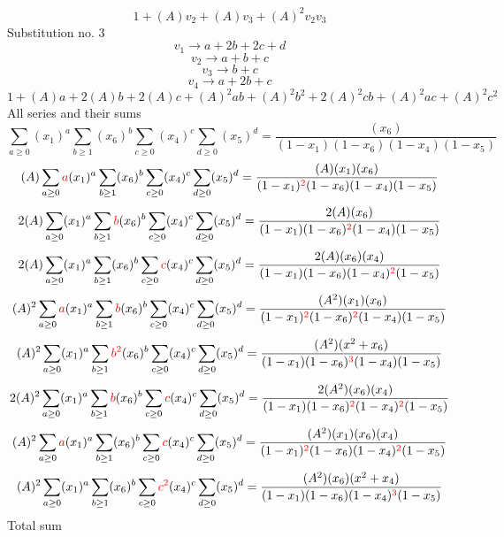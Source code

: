 \documentclass{article}
\begin{document}
\[1+(A)v_2+(A)v_3+(A)^2v_2v_3\]Substitution no. 3\[v_1\rightarrow{a+2b+2c+d}\]\[v_2\rightarrow{a+b+c}\]\[v_3\rightarrow{b+c}\]\[v_4\rightarrow{a+2b+c}\]\[1+(A)a+2(A)b+2(A)c+(A)^2ab+(A)^2b^{2}+2(A)^2cb+(A)^2ac+(A)^2c^{2}\]All series and their sums\[\sum_{a\geq{0}}(x_1)^{a}\sum_{b\geq{1}}(x_6)^{b}\sum_{c\geq{0}}(x_4)^{c}\sum_{d\geq{0}}(x_5)^{d}=\frac{(x_6)}{(1-x_1)(1-x_6)(1-x_4)(1-x_5)}\]\[(A)\sum_{a\geq{0}}\textcolor{red}{a}(x_1)^{a}\sum_{b\geq{1}}(x_6)^{b}\sum_{c\geq{0}}(x_4)^{c}\sum_{d\geq{0}}(x_5)^{d}=\frac{(A)(x_1)(x_6)}{(1-x_1)^{\textcolor{red}{2}}(1-x_6)(1-x_4)(1-x_5)}\]\[2(A)\sum_{a\geq{0}}(x_1)^{a}\sum_{b\geq{1}}\textcolor{red}{b}(x_6)^{b}\sum_{c\geq{0}}(x_4)^{c}\sum_{d\geq{0}}(x_5)^{d}=\frac{2(A)(x_6)}{(1-x_1)(1-x_6)^{\textcolor{red}{2}}(1-x_4)(1-x_5)}\]\[2(A)\sum_{a\geq{0}}(x_1)^{a}\sum_{b\geq{1}}(x_6)^{b}\sum_{c\geq{0}}\textcolor{red}{c}(x_4)^{c}\sum_{d\geq{0}}(x_5)^{d}=\frac{2(A)(x_6)(x_4)}{(1-x_1)(1-x_6)(1-x_4)^{\textcolor{red}{2}}(1-x_5)}\]\[(A)^{2}\sum_{a\geq{0}}\textcolor{red}{a}(x_1)^{a}\sum_{b\geq{1}}\textcolor{red}{b}(x_6)^{b}\sum_{c\geq{0}}(x_4)^{c}\sum_{d\geq{0}}(x_5)^{d}=\frac{(A^{2})(x_1)(x_6)}{(1-x_1)^{\textcolor{red}{2}}(1-x_6)^{\textcolor{red}{2}}(1-x_4)(1-x_5)}\]\[(A)^{2}\sum_{a\geq{0}}(x_1)^{a}\sum_{b\geq{1}}\textcolor{red}{b^{2}}(x_6)^{b}\sum_{c\geq{0}}(x_4)^{c}\sum_{d\geq{0}}(x_5)^{d}=\frac{(A^{2})(x^{2}+x_6)}{(1-x_1)(1-x_6)^{\textcolor{red}{3}}(1-x_4)(1-x_5)}\]\[2(A)^{2}\sum_{a\geq{0}}(x_1)^{a}\sum_{b\geq{1}}\textcolor{red}{b}(x_6)^{b}\sum_{c\geq{0}}\textcolor{red}{c}(x_4)^{c}\sum_{d\geq{0}}(x_5)^{d}=\frac{2(A^{2})(x_6)(x_4)}{(1-x_1)(1-x_6)^{\textcolor{red}{2}}(1-x_4)^{\textcolor{red}{2}}(1-x_5)}\]\[(A)^{2}\sum_{a\geq{0}}\textcolor{red}{a}(x_1)^{a}\sum_{b\geq{1}}(x_6)^{b}\sum_{c\geq{0}}\textcolor{red}{c}(x_4)^{c}\sum_{d\geq{0}}(x_5)^{d}=\frac{(A^{2})(x_1)(x_6)(x_4)}{(1-x_1)^{\textcolor{red}{2}}(1-x_6)(1-x_4)^{\textcolor{red}{2}}(1-x_5)}\]\[(A)^{2}\sum_{a\geq{0}}(x_1)^{a}\sum_{b\geq{1}}(x_6)^{b}\sum_{c\geq{0}}\textcolor{red}{c^{2}}(x_4)^{c}\sum_{d\geq{0}}(x_5)^{d}=\frac{(A^{2})(x_6)(x^{2}+x_4)}{(1-x_1)(1-x_6)(1-x_4)^{\textcolor{red}{3}}(1-x_5)}\]
Total sum
\end{document}
